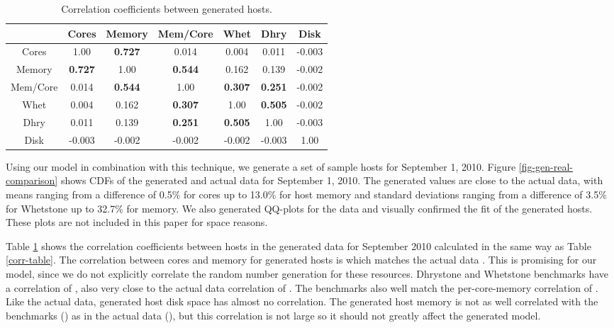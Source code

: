 \documentclass[conference]{IEEEtran}
\begin{document}
\begin{table}
\caption{Correlation coefficients between generated hosts.}
\centering
\scriptsize
\begin{tabular}{|c|c|c|c|c|c|c|}
\hline
& Cores & Memory & Mem/Core & Whet & Dhry & Disk \\
\hline
Cores & 1.00 & \cellcolor[gray]{.7} \textbf{0.727} & 0.014 & 0.004 & 0.011 & -0.003 \\
\hline
Memory & \cellcolor[gray]{.7} \textbf{0.727} & 1.00 & \cellcolor[gray]{.8} \textbf{0.544} & 0.162 & 0.139 & -0.002 \\
\hline
Mem/Core & 0.014 & \cellcolor[gray]{.8} \textbf{0.544} & 1.00 & \cellcolor[gray]{.9} \textbf{0.307} & \cellcolor[gray]{.9} \textbf{0.251} & -0.002 \\
\hline
Whet & 0.004 & 0.162 & \cellcolor[gray]{.9} \textbf{0.307} & 1.00 & \cellcolor[gray]{.8} \textbf{0.505} & -0.002 \\
\hline
Dhry & 0.011 & 0.139 & \cellcolor[gray]{.9} \textbf{0.251} & \cellcolor[gray]{.8} \textbf{0.505} & 1.00 & -0.003 \\
\hline
Disk & -0.003 & -0.002 & -0.002 & -0.002 & -0.003 & 1.00 \\
\hline
\end{tabular}
\label{gen-corr-table}
\end{table}

Using our model in combination with this technique, we
generate a set of sample hosts for September 1, 2010.
Figure \ref{fig-gen-real-comparison} shows CDFs of the
generated and actual data for September 1, 2010.  The
generated values are close to the actual data, with means
ranging from a difference of 0.5\% for cores up to 13.0\%
for host memory and standard deviations ranging from a
difference of 3.5\% for Whetstone up to 32.7\% for memory.
We also generated QQ-plots for the data and visually confirmed
the fit of the generated hosts.  These plots are not included
in this paper for space reasons.

Table \ref{gen-corr-table} shows the correlation coefficients between hosts in the generated data for September 2010 calculated in the same way as Table \ref{corr-table}.  The correlation between cores and memory for generated hosts is  which matches the actual data .  This is promising for our model, since we do not explicitly correlate the random number generation for these resources.  Dhrystone and Whetstone benchmarks have a correlation of , also very close to the actual data correlation of .  The benchmarks also well match the per-core-memory correlation of .  Like the actual data, generated host disk space has almost no correlation.  The generated host memory is not as well correlated with the benchmarks () as in the actual data (), but this correlation is not large so it should not greatly affect the generated model.
\end{document}
